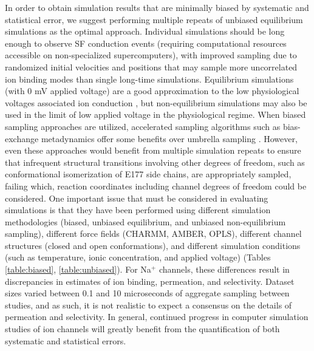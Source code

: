 \begin{refsection}
In order to obtain simulation results that are minimally biased by systematic and statistical error, we suggest performing multiple repeats of unbiased equilibrium simulations as the optimal approach.  Individual simulations should be long enough to observe SF conduction events (requiring computational resources accessible on non-specialized supercomputers), with improved sampling due to randomized initial velocities and positions that may sample more uncorrelated ion binding modes than single long-time simulations.  Equilibrium simulations (with 0 mV applied voltage) are a good approximation to the low physiological voltages associated ion conduction \cite{Hille:2001tw}, but non-equilibrium simulations may also be used in the limit of low applied voltage in the physiological regime.  When biased sampling approaches are utilized, accelerated sampling algorithms such as bias-exchange metadynamics offer some benefits over umbrella sampling \cite{Domene:2015kj}. However, even these approaches would benefit from multiple simulation repeats to ensure that infrequent structural transitions involving other degrees of freedom, such as conformational isomerization of E177 side chains, are appropriately sampled, failing which, reaction coordinates including channel degrees of freedom could be considered.
One important issue that must be considered in evaluating simulations is that they have been performed using different simulation methodologies (biased, unbiased equilibrium, and unbiased non-equilibrium sampling), different force fields (CHARMM, AMBER, OPLS), different channel structures (closed and open conformations), and different simulation conditions (such as temperature, ionic concentration, and applied voltage) (Tables \ref{table:biased}, \ref{table:unbiased}). For Na$^{+}$ channels, these differences result in discrepancies in estimates of ion binding, permeation, and selectivity.  Dataset sizes varied between 0.1 and 10 microseconds of aggregate sampling between studies, and as such, it is not realistic to expect a consensus on the details of permeation and selectivity.  In general, continued progress in computer simulation studies of ion channels will greatly benefit from the quantification of both systematic and statistical errors. 
 
 
\printbibliography[heading=subbibnumbered,title={References}]
 \end{refsection}
